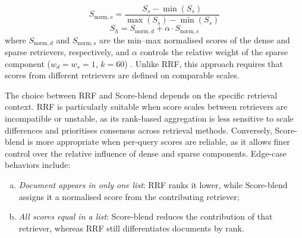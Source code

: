 \begin{spacing}{1.5}
\begin{itemize}
\begin{itemize}
\[S_{\text{norm},s} = \frac{S_s - \min(S_s)}{\max(S_s) - \min(S_s)}
\]
\[
S_h = S_{\text{norm},d} + \alpha \cdot S_{\text{norm},s}
\]
where $S_{\text{norm},d}$ and $S_{\text{norm},s}$ are the min–max normalised scores of the dense and sparse retrievers, respectively, and $\alpha$ controls the relative weight of the sparse component ($w_d = w_s = 1$, $k = 60$) \citep{wang_searching_2024}. Unlike RRF, this approach requires that scores from different retrievers are defined on comparable scales.
\end{itemize}
\end{itemize}
\vspace{1em}

The choice between RRF and Score-blend depends on the specific retrieval context. RRF is particularly suitable when score scales between retrievers are incompatible or unstable, as its rank-based aggregation is less sensitive to scale differences and prioritises consensus across retrieval methods. Conversely, Score-blend is more appropriate when per-query scores are reliable, as it allows finer control over the relative influence of dense and sparse components. Edge-case behaviors include: 
\begin{enumerate}[(a)] 
\item \textit{Document appears in only one list}: RRF ranks it lower, while Score-blend assigns it a normalised score from the contributing retriever;
\item \textit{All scores equal in a list}: Score-blend reduces the contribution of that retriever, whereas RRF still differentiates documents by rank.
\end{enumerate}



\end{spacing}
